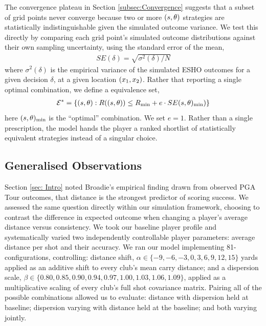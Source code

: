 \documentclass[11pt, letterpaper]{article}
\begin{document}
The convergence plateau in Section \ref{subsec:Convergence} suggests that a subset of grid points never converge because two or more $(s, \theta)$ strategies are statistically indistinguishable given the simulated outcome variance. We test this directly by comparing each grid point's simulated outcome distributions against their own sampling uncertainty, using the standard error of the mean,
\begin{align}
    SE(\delta) = \sqrt{\sigma^2(\delta)/N}
\end{align}
where $\sigma^2(\delta)$ is the empirical variance of the simulated ESHO outcomes for a given decision $\delta$, at a given location $(x_1, x_2)$. Rather that reporting a single optimal combination, we define a equivalence set,
\begin{align}
    \mathcal{E}^* = \left\{ (s, \theta) : R((s, \theta)) \leq R_{\min} + e \cdot SE(s, \theta)_ {\min}) \right\}
\end{align}
here $(s, \theta)_{\min}$ is the ``optimal'' combination. We set $e = 1$.  Rather than a single prescription, the model hands the player a ranked shortlist of statistically equivalent strategies instead of a singular choice. 



\subsection{Generalised Observations}
\label{subsec: genObs}
Section \ref{sec: Intro} noted Broadie's empirical finding drawn from observed PGA Tour outcomes, that distance is the strongest predictor of scoring success. We assessed the same question directly within our simulation framework, choosing to contrast the difference in expected outcome when changing a player's average distance versus consistency. We took our baseline player profile and systematically varied two independently controllable player parameters: average distance per shot and their accuracy. We ran our model implementing 81-configurations, controlling: distance shift, $\alpha \in \{-9, -6, -3, 0, 3, 6, 9, 12, 15\}$ yards applied as an additive shift to every club's mean carry distance; and a dispersion scale, $\beta \in \{0.80, 0.85, 0.90, 0.94, 0.97, 1.00, 1.03, 1.06, 1.09\}$, applied as a multiplicative scaling of every club's full shot covariance matrix. Pairing all of the possible combinations allowed us to evaluate: distance with dispersion held at baseline; dispersion varying with distance held at the baseline; and both varying jointly. 
\end{document}

